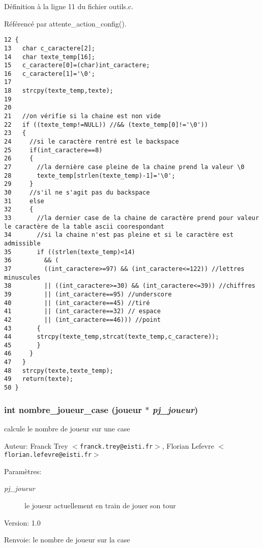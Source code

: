 D\'{e}finition \`{a} la ligne 11 du fichier outils.c.

R\'{e}f\'{e}renc\'{e} par attente\_\-action\_\-config().

\begin{Code}\begin{verbatim}12 {
13   char c_caractere[2];
14   char texte_temp[16];
15   c_caractere[0]=(char)int_caractere;
16   c_caractere[1]='\0';
17 
18   strcpy(texte_temp,texte);
19   
20   
21   //on vérifie si la chaine est non vide
22   if ((texte_temp!=NULL)) //&& (texte_temp[0]!='\0'))
23   {
24     //si le caractère rentré est le backspace
25     if(int_caractere==8)
26     {
27       //la dernière case pleine de la chaine prend la valeur \0
28       texte_temp[strlen(texte_temp)-1]='\0';
29     }
30     //s'il ne s'agit pas du backspace
31     else
32     {
33       //la dernier case de la chaine de caractère prend pour valeur le caractère de la table ascii coorespondant
34       //si la chaine n'est pas pleine et si le caractère est admissible
35       if ((strlen(texte_temp)<14) 
36         && ( 
37         ((int_caractere>=97) && (int_caractere<=122)) //lettres minuscules
38         || ((int_caractere>=30) && (int_caractere<=39)) //chiffres
39         || (int_caractere==95) //underscore
40         || (int_caractere==45) //tiré
41         || (int_caractere==32) // espace
42         || (int_caractere==46))) //point
43       {
44       strcpy(texte_temp,strcat(texte_temp,c_caractere));
45       }
46     }
47   }
48   strcpy(texte,texte_temp);
49   return(texte);
50 }
\end{verbatim}\end{Code}


\subsubsection{\setlength{\rightskip}{0pt plus 5cm}int nombre\_\-joueur\_\-case ({\bf joueur} $\ast$ {\em pj\_\-joueur})}\label{outils_8h_628b8ba74e55cbdc77d8c2e5e594bc8e}


calcule le nombre de joueur sur une case 

\begin{Desc}
\item[Auteur:]Franck Trey $<${\tt franck.trey@eisti.fr}$>$, Florian Lefevre $<${\tt florian.lefevre@eisti.fr}$>$\end{Desc}
\begin{Desc}
\item[Param\`{e}tres:]
\begin{description}
\item[{\em pj\_\-joueur}]le joueur actuellement en train de jouer son tour\end{description}
\end{Desc}
\begin{Desc}
\item[Version:]1.0 \end{Desc}
\begin{Desc}
\item[Renvoie:]le nombre de joueur sur la case \end{Desc}


